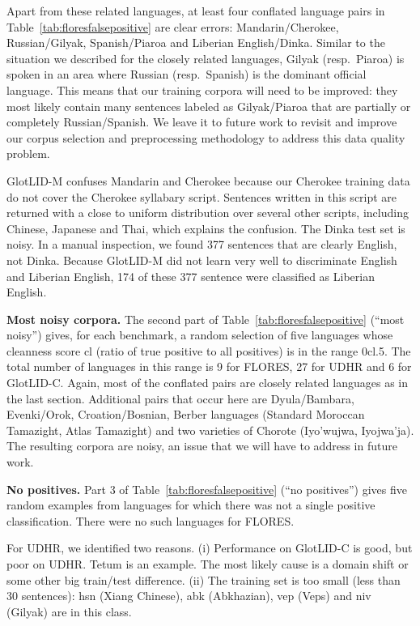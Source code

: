 \documentclass[11pt]{article}
\def\modelname{\mbox{GlotLID-M}\xspace}
\def\corpusname{\mbox{GlotLID-C}\xspace}
\def\flores{FLORES\xspace}
\def\udhr{UDHR\xspace}
\def\tabref#1{Table~\ref{tab:#1}}
\begin{document}
Apart from these related languages, at least four
conflated language pairs
in \tabref{floresfalsepositive}
are clear errors:
Mandarin/Cherokee, Russian/Gilyak, Spanish/Piaroa and
Liberian English/Dinka.
Similar to the situation we described for the closely
related languages,
Gilyak (resp.\ Piaroa) is spoken in an area where Russian
(resp.\ Spanish)
is the dominant
official language.
This means that our training corpora will need to be
improved: they most likely contain many
sentences labeled as Gilyak/Piaroa that are partially or
completely Russian/Spanish. 
We leave it to future work to
revisit and improve our corpus selection and preprocessing
methodology to address this data quality problem.



\modelname confuses
Mandarin and Cherokee because
our Cherokee training data do not cover
the Cherokee syllabary script.
Sentences written in this script are returned with a
close to uniform distribution over several other scripts,
including Chinese, Japanese and Thai, which explains the confusion.
The Dinka test set is noisy. In a manual inspection, we
found 377 sentences that are clearly English, not
Dinka. Because \modelname did not learn very well to discriminate
English and Liberian English, 174 of these 377 sentence were
classified as Liberian English.

\textbf{Most noisy corpora.}
The second part of 
\tabref{floresfalsepositive} (``most noisy'') gives,
for each benchmark, a random selection of five languages
whose cleanness score cl (ratio of true positive to all
positives) is in the range 0cl.5. The total number of
languages in this range is 9 for \flores, 27 for \udhr and 6
for \corpusname. Again, most of the conflated pairs are
closely related languages as in the last section. Additional
pairs that occur here are Dyula/Bambara, Evenki/Orok,
Croation/Bosnian, Berber languages (Standard Moroccan
Tamazight,
Atlas
Tamazight) and two varieties of Chorote (Iyo'wujwa,
Iyojwa’ja). The resulting corpora are noisy,
an issue that we will have to address in future work.


\textbf{No positives.}
Part 3 of \tabref{floresfalsepositive} (``no positives'') gives five random examples from
languages for which there was not a single positive
classification. There were no such languages for \flores.


For \udhr, we identified two reasons. (i) Performance
on \corpusname is good, but poor on \udhr. Tetum is an
example.  The most likely cause is a domain shift or some
other big train/test difference.  (ii) The training set
is too small (less than 30 sentences): hsn (Xiang Chinese),
abk (Abkhazian), vep (Veps) and niv (Gilyak) are in this
class.
\end{document}
